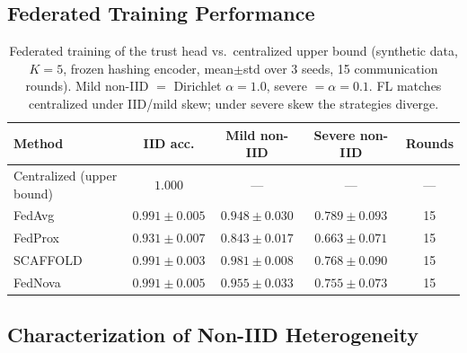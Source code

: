 \documentclass[sigconf,nonacm]{acmart}
\begin{document}
\subsection{Federated Training Performance}


\begin{table}[h]
\caption{Federated training of the trust head vs.\ centralized upper bound (synthetic data, $K{=}5$, frozen hashing encoder, mean$\pm$std over 3 seeds, 15 communication rounds). Mild non-IID $=$ Dirichlet $\alpha{=}1.0$, severe $=\alpha{=}0.1$. FL matches centralized under IID/mild skew; under severe skew the strategies diverge.}
\label{tab:fl-comparison}
\centering
\begin{tabular}{lcccc}
\toprule
Method & IID acc. & Mild non-IID & Severe non-IID & Rounds \\
\midrule
Centralized (upper bound) & $1.000$ & --- & --- & --- \\
FedAvg & $0.991 \pm 0.005$ & $0.948 \pm 0.030$ & $0.789 \pm 0.093$ & 15 \\
FedProx & $0.931 \pm 0.007$ & $0.843 \pm 0.017$ & $0.663 \pm 0.071$ & 15 \\
SCAFFOLD & $0.991 \pm 0.003$ & $0.981 \pm 0.008$ & $0.768 \pm 0.090$ & 15 \\
FedNova & $0.991 \pm 0.005$ & $0.955 \pm 0.033$ & $0.755 \pm 0.073$ & 15 \\
\bottomrule
\end{tabular}
\end{table}

\subsection{Characterization of Non-IID Heterogeneity}

\end{document}
